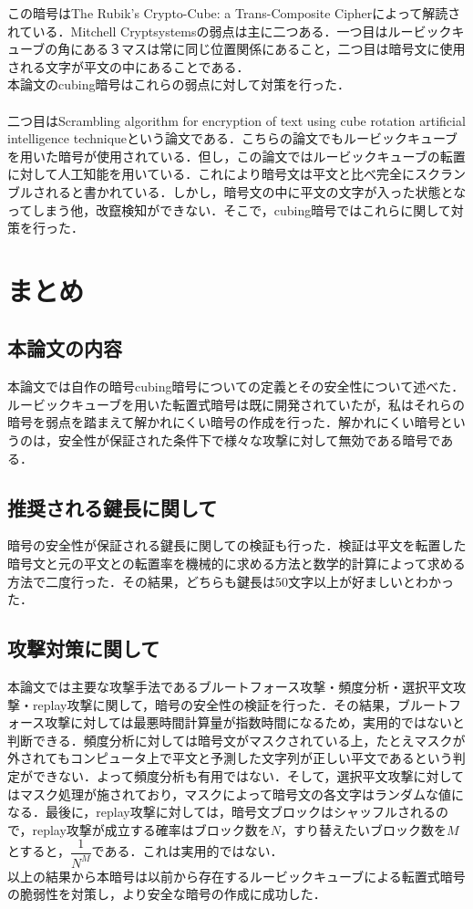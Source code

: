 \documentclass[titlepage]{jarticle}
\begin{document}
この暗号はThe Rubik's Crypto-Cube: a Trans-Composite Cipher\cite{Trans-Composite Cipher}によって解読されている．Mitchell Cryptsystemsの弱点は主に二つある．一つ目はルービックキューブの角にある３マスは常に同じ位置関係にあること，二つ目は暗号文に使用される文字が平文の中にあることである．\\
本論文のcubing暗号はこれらの弱点に対して対策を行った．\\\\

二つ目はScrambling algorithm for encryption of text using cube rotation artificial intelligence technique\cite{Scrambling algorithm}という論文である．こちらの論文でもルービックキューブを用いた暗号が使用されている．但し，この論文ではルービックキューブの転置に対して人工知能を用いている．これにより暗号文は平文と比べ完全にスクランブルされると書かれている．しかし，暗号文の中に平文の文字が入った状態となってしまう他，改竄検知ができない．そこで，cubing暗号ではこれらに関して対策を行った．


\section{まとめ}

\subsection{本論文の内容}
本論文では自作の暗号cubing暗号についての定義とその安全性について述べた．ルービックキューブを用いた転置式暗号は既に開発されていたが，私はそれらの暗号を弱点を踏まえて解かれにくい暗号の作成を行った．解かれにくい暗号というのは，安全性が保証された条件下で様々な攻撃に対して無効である暗号である．

\subsection{推奨される鍵長に関して}
暗号の安全性が保証される鍵長に関しての検証も行った．検証は平文を転置した暗号文と元の平文との転置率を機械的に求める方法と数学的計算によって求める方法で二度行った．その結果，どちらも鍵長は50文字以上が好ましいとわかった．

\subsection{攻撃対策に関して}
本論文では主要な攻撃手法であるブルートフォース攻撃・頻度分析・選択平文攻撃・replay攻撃に関して，暗号の安全性の検証を行った．その結果，ブルートフォース攻撃に対しては最悪時間計算量が指数時間になるため，実用的ではないと判断できる．頻度分析に対しては暗号文がマスクされている上，たとえマスクが外されてもコンピュータ上で平文と予測した文字列が正しい平文であるという判定ができない．よって頻度分析も有用ではない．そして，選択平文攻撃に対してはマスク処理が施されており，マスクによって暗号文の各文字はランダムな値になる．最後に，replay攻撃に対しては，暗号文ブロックはシャッフルされるので，replay攻撃が成立する確率はブロック数を\(N\)，すり替えたいブロック数を\(M\)とすると，\(\dfrac{1}{N^M}\)である．これは実用的ではない．\\
以上の結果から本暗号は以前から存在するルービックキューブによる転置式暗号の脆弱性を対策し，より安全な暗号の作成に成功した．
\end{document}
